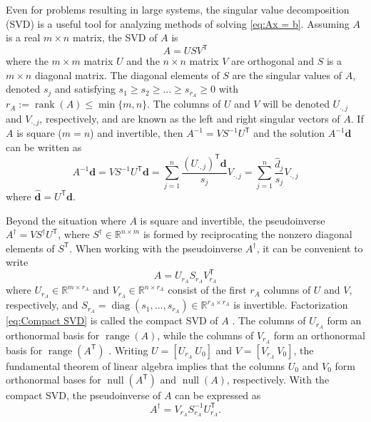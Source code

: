 \documentclass[12pt]{article}
\newcommand{\mA}{m}	%
\newcommand{\rA}{r_A}	%
\newcommand{\dVec}{\mathbf{d}}	%
\newcommand{\trans}[1]{{#1}^\mathsf{T}}	%
\newcommand{\inv}[1]{{#1}^{-1}}	%
\newcommand{\pinv}[1]{{#1}^\dagger}	%
\DeclareMathOperator{\diag}{diag}	%
\DeclareMathOperator{\rank}{rank}	%
\DeclareMathOperator{\range}{range}	%
\DeclareMathOperator{\nullspace}{null}	%
\newcommand{\singular}{s}	%
\newcommand{\svd}[1]{\widehat{#1}}	%
\begin{document}
Even for problems resulting in large systems, the singular value decomposition (SVD) is a useful tool for analyzing methods of solving \eqref{eq:Ax = b}.  Assuming $A$ is a real $\mA \times n$ matrix, the SVD of $A$ is
\begin{equation}
\label{eq:SVD}
A = US\trans{V}
\end{equation}
where the $\mA \times \mA$ matrix $U$ and the $n \times n$ matrix $V$ are orthogonal and $S$ is a $\mA \times n$ diagonal matrix. The diagonal elements of $S$ are the singular values of $A$, denoted $\singular_j$ and satisfying $\singular_1 \geq \singular_2 \geq \ldots \geq \singular_{\rA} \geq 0$ with $\rA := \rank(A) \leq \min\{\mA,n\}$. The columns of $U$ and $V$ will be denoted $U_{\cdot,j}$ and $V_{\cdot,j}$, respectively, and are known as the left and right singular vectors of $A$. If $A$ is square ($\mA = n$) and invertible, then $\inv{A} = V\inv{S}\trans{U}$ and the solution $\inv{A}\dVec$ can be written as
\begin{equation}
\label{eq:InvProd}
\inv{A}\dVec = VS^{-1}{\trans{U}}\dVec = \sum_{j=1}^{n} \frac{{\trans{(U_{\cdot,j})}}\dVec}{\singular_j}V_{\cdot,j} = \sum_{j=1}^{n} \frac{\svd{d}_j}{\singular_j}V_{\cdot,j}
\end{equation}
where $\svd{\dVec} = \trans{U}\dVec$. \par 
Beyond the situation where $A$ is square and invertible, the pseudoinverse \cite{Penrose1955} $\pinv{A} = V\pinv{S}\trans{U}$, where $\pinv{S} \in \mathbb{R}^{n \times \mA}$ is formed by reciprocating the nonzero diagonal elements of $\trans{S}$. When working with the pseudoinverse $\pinv{A}$, it can be convenient to write
\begin{equation}
\label{eq:Compact SVD}
A = U_{\rA}S_{\rA}\trans{V}_{\rA}
\end{equation}
where $U_{\rA} \in \mathbb{R}^{\mA \times \rA}$ and $V_{\rA} \in \mathbb{R}^{n \times \rA}$ consist of the first $\rA$ columns of $U$ and $V$, respectively, and $S_{\rA} = \diag(\singular_1,\ldots,\singular_{\rA}) \in \mathbb{R}^{\rA \times \rA}$ is invertible. Factorization \eqref{eq:Compact SVD} is called the compact SVD of $A$ \cite{ABT,Leon2010}. The columns of $U_{\rA}$ form an orthonormal basis for $\range(A)$, while the columns of $V_{\rA}$ form an orthonormal basis for $\range(\trans{A})$ \cite[p.~340]{Leon2010}. Writing $U = [U_{\rA} ~ U_0]$ and $V = [V_{\rA} ~ V_0]$, the fundamental theorem of linear algebra \cite{Strang1993} implies that the columns $U_0$  and $V_0$ form orthonormal bases for $\nullspace(\trans{A})$ and $\nullspace(A)$, respectively. With the compact SVD, the pseudoinverse of $A$ can be expressed as 
\begin{equation}
\label{eq:Pseudoinverse}
    \pinv{A} = V_{\rA}\inv{S}_{\rA}\trans{U}_{\rA}.
\end{equation}
\end{document}
